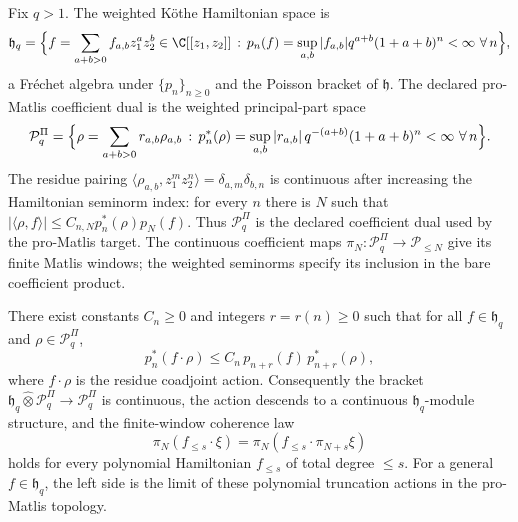 \begin{defn}
\label{def:completion-weighted-kothe}
Fix \(q>1\).  The weighted K\"othe Hamiltonian space is
\[
  \mathfrak h_q
  =\Bigl\{f=\sum_{a+b>0}f_{a,b}z_1^az_2^b\in\C[[z_1,z_2]]\,:\,
   p_n(f)=\sup_{a,b}|f_{a,b}|q^{a+b}(1+a+b)^n<\infty
   \,\,\forall\,n\Bigr\},
\]
a Fr\'echet algebra under
\(\{p_n\}_{n\ge 0}\) and the Poisson bracket of \(\mathfrak h\).
The declared pro-Matlis coefficient dual is the weighted principal-part
space
\[
  \mathcal P^\Pi_q
  =
  \Bigl\{\rho=\sum_{a+b>0}r_{a,b}\rho_{a,b}\,:\,
  p^*_n(\rho)=
  \sup_{a,b}|r_{a,b}|\,q^{-(a+b)}(1+a+b)^n<\infty
  \,\,\forall\,n\Bigr\}.
\]
The residue pairing
\(\langle\rho_{a,b},z_1^mz_2^n\rangle=\delta_{a,m}\delta_{b,n}\)
is continuous after increasing the Hamiltonian seminorm index:
for every \(n\) there is \(N\) such that
\(|\langle\rho,f\rangle|\le C_{n,N}p^*_n(\rho)p_N(f)\).
Thus \(\mathcal P^\Pi_q\) is the declared coefficient dual used by the
pro-Matlis target.  The continuous coefficient maps
\(\pi_N\colon\mathcal P^\Pi_q\to\mathcal P_{\leq N}\) give its
finite Matlis windows; the weighted seminorms specify its inclusion in
the bare coefficient product.
\end{defn}

\begin{prop}
\label{prop:completion-promatlis-continuity}
There exist constants \(C_n\ge 0\) and integers
\(r=r(n)\ge 0\) such that for all \(f\in\mathfrak h_q\) and
\(\rho\in\mathcal P^\Pi_q\),
\[
  p^*_n(f\cdot\rho)\le C_n\,p_{n+r}(f)\,p^*_{n+r}(\rho),
\]
where \(f\cdot\rho\) is the residue coadjoint action.  Consequently
the bracket
\(\mathfrak h_q\widehat\otimes\mathcal P^\Pi_q\to\mathcal P^\Pi_q\)
is continuous, the action descends to a continuous
\(\mathfrak h_q\)-module structure, and the finite-window coherence law
\[
  \pi_N(f_{\le s}\cdot\xi)
  =
  \pi_N(f_{\le s}\cdot\pi_{N+s}\xi)
\]
holds for every polynomial Hamiltonian \(f_{\le s}\) of total degree
\(\le s\).  For a general \(f\in\mathfrak h_q\), the left side is the
limit of these polynomial truncation actions in the pro-Matlis topology.
\end{prop}

